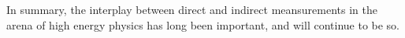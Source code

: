 
%
%
%
%
%







In summary, the interplay between direct and indirect meansurements in the arena of high energy
physics has long been important, and will continue to be so.






